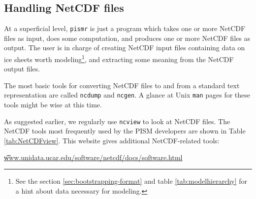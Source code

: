 



\subsection{Handling NetCDF files}\label{subsect:nctoolsintro}  At a superficial level, \verb|pismr| is just a program which takes one or more NetCDF files as input, does some computation, and produces one or more NetCDF files as output.  The user is in charge of creating NetCDF input files containing data on ice sheets worth modeling\footnote{See the section \ref{sec:bootstrapping-format} and table \ref{tab:modelhierarchy} for a hint about data necessary for modeling.}, and extracting some meaning from the NetCDF output files.

The most basic tools for converting NetCDF files to and from a standard text representation are called \verb|ncdump| and \verb|ncgen|.  A glance at Unix \verb|man| pages for these tools might be wise at this time.

As suggested earlier, we regularly use \verb|ncview| to look at NetCDF files.  The NetCDF tools most frequently used by the PISM developers are shown in Table \ref{tab:NetCDFview}.  This website gives additional NetCDF-related tools:

\centerline{ \href{http://www.unidata.ucar.edu/software/netcdf/docs/software.html}{\t{www.unidata.ucar.edu/software/netcdf/docs/software.html}} } 


